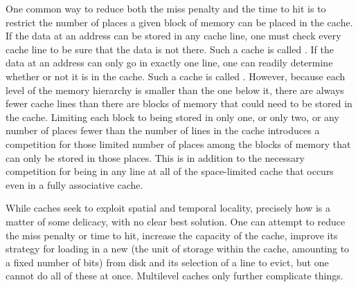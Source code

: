 One common way to reduce both the miss penalty and the time to hit is to restrict the number of places a given block of memory can be placed in the cache. If the data at an address can be stored in any cache line, one must check every cache line to be sure that the data is not there. Such a cache is called . If the data at an address can only go in exactly one line, one can readily determine whether or not it is in the cache. Such a cache is called . However, because each level of the memory hierarchy is smaller than the one below it, there are always fewer cache lines than there are blocks of memory that could need to be stored in the cache. Limiting each block to being stored in only one, or only two, or any number of places fewer than the number of lines in the cache introduces a competition for those limited number of places among the blocks of memory that can only be stored in those places. This is in addition to the necessary competition for being in any line at all of the space-limited cache that occurs even in a fully associative cache.

While caches seek to exploit spatial and temporal locality, precisely how is a matter of some delicacy, with no clear best solution. One can attempt to reduce the miss penalty or time to hit, increase the capacity of the cache, improve its strategy for loading in a new  (the unit of storage within the cache, amounting to a fixed number of bits) from disk and its selection of a line to evict, but one cannot do all of these at once. Multilevel caches only further complicate things.

